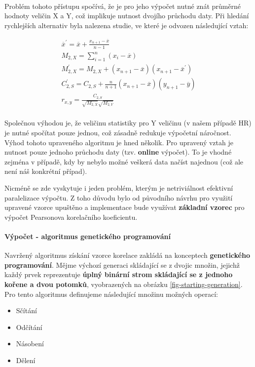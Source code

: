 \documentclass[12pt, a4paper]{article}
\begin{document}
\paragraph{} Problém tohoto přístupu spočívá, že je pro jeho výpočet nutné znát průměrné hodnoty veličin X a Y, což implikuje nutnost dvojího průchodu daty.
Při hledání rychlejších alternativ byla nalezena studie, ve které je odvozen následující vztah: 

\begin{equation}
  \begin{aligned}
    \overline{x}^{'} = \overline{x} + \frac{x_{n+1} - \overline{x}}{n - 1} \\
    M_{2, X} = \sum_{i=1}^{n}{(x_i - \overline{x})} \\
    M_{2, X}^{'} = M_{2, X} + (x_{n + 1} - \overline{x})(x_{n + 1} - \overline{x}^{'}) \\
    C_{2, S}^{'} = C_{2, S} + \frac{n}{n+1}(x_{n+1} - \overline{x})(y_{n+1} - \overline{y}) \\
    r_{x, y} = \frac{C_{2, S}}{\sqrt{M_{2, X}} \sqrt{M_{2, Y}}} 
  \end{aligned}
\end{equation}

\paragraph{} Společnou výhodou je, že veličinu statistiky pro Y veličinu (v našem případě HR) je nutné spočítat pouze jednou, což zásadně redukuje výpočetní náročnost. 
Výhod tohoto upraveného algoritmu je hned několik.
Pro upravený vztah je nutnost pouze jednoho průchodu daty (tzv. \textbf{online} výpočet). 
To je vhodné zejména v případě, kdy by nebylo možné veškerá data načíst najednou (což ale není náš konkrétní případ). 

Nicméně se zde vyskytuje i jeden problém, kterým je netriviálnost efektivní paralelizace výpočtu.
Z toho důvodu bylo od původního návrhu pro využití upravené vzorce upuštěno a implementace bude využívat \textbf{základní vzorec} pro výpočet Pearsonova korelačního koeficientu.


\paragraph{Výpočet - algoritmus genetického programování} Navržený algoritmus získání vzorce korelace zakládá na konceptech \textbf{genetického programování}.
Mějme výchozí generaci skládající se z dvojic množin, jejichž každý prvek reprezentuje \textbf{úplný binární strom skládající se z jednoho kořene a dvou potomků}, vyobrazených na obrázku \ref{fig-starting-generation}.
Pro tento algoritmus definujeme následující množinu možných operací: 
\begin{itemize}
  \item Sčítání
  \item Odčítání
  \item Násobení
  \item Dělení
\end{itemize}
 
\end{document}
